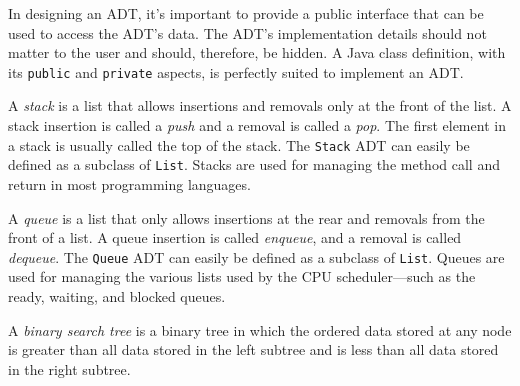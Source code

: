 \begin{SMBL}
\item  In designing an ADT, it's important to provide a public
interface that can be used to access the ADT's data.  The ADT's
implementation details should not matter to the user and should,
therefore, be hidden.  A Java class definition, with its {\tt public}
and {\tt private} aspects, is perfectly suited to implement an ADT.

\item  A {\it stack} is a list that allows insertions and removals
only at the front of the list.  A stack insertion is called a {\it
push} and a removal is called a {\it pop}. The first element in a
stack is usually called the top of the stack.   The {\tt Stack} ADT can
easily be defined as a subclass of {\tt List}. Stacks are used
for managing the method call and return in most programming languages.

\item  A {\it queue} is a list that only allows insertions at the
rear and removals from the front of a list.  A queue insertion is
called {\it enqueue}, and a removal is called {\it dequeue}.  The
{\tt Queue} ADT can easily be defined as a subclass of {\tt List}. Queues
are used for managing the various lists used by the CPU scheduler---such as
the ready, waiting, and blocked queues.

\item  A {\it binary search tree} is a binary tree in which the ordered data
stored at any node is greater than all data stored in the left 
subtree and is less
than all data stored in the right subtree.
\end{SMBL}



\secANSH

